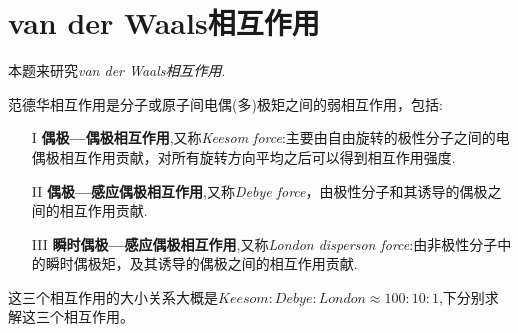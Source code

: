 \documentclass{article}
\begin{document}
\section*{van der Waals相互作用}
本题来研究\textit{van der Waals相互作用}.\par
范德华相互作用是分子或原子间电偶(多)极矩之间的弱相互作用，包括:
\begin{itemize}
    \item[I]\textbf{偶极—偶极相互作用},又称\textit{Keesom force}:主要由自由旋转的极性分子之间的电偶极相互作用贡献，对所有旋转方向平均之后可以得到相互作用强度.%
    \item[II]\textbf{偶极—感应偶极相互作用},又称\textit{Debye force}，由极性分子和其诱导的偶极之间的相互作用贡献.%
    \item[III]\textbf{瞬时偶极—感应偶极相互作用},又称\textit{London disperson force}:由非极性分子中的瞬时偶极矩，及其诱导的偶极之间的相互作用贡献.%
\end{itemize}
这三个相互作用的大小关系大概是$Keesom:Debye:London\approx 100:10:1$,下分别求解这三个相互作用。
\end{document}
